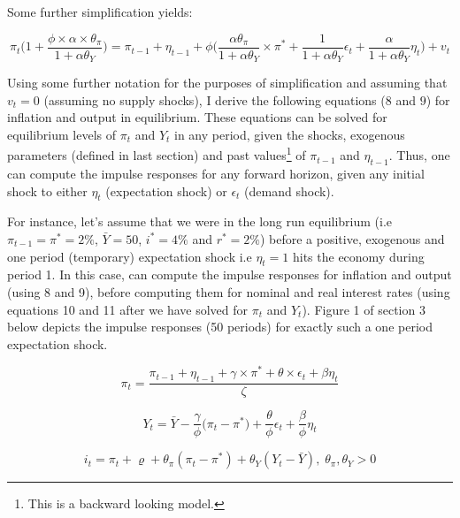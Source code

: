 \documentclass[12pt]{article}
\newcommand{\1}{\mathbbm 1}
\renewcommand{\rho}{\varrho}
\begin{document}
Some further simplification yields:

\begin{equation*}
	\pi_{t}\bigg(1 +  \frac{\phi \times \alpha \times \theta_{\pi}}{1 + \alpha \theta_{Y}}\bigg)  = \pi_{t-1} + \eta_{t-1} + \phi\bigg(\frac{\alpha \theta_{\pi}}{1 + \alpha \theta_{Y}} \times \pi^{*} + \frac{1}{1 + \alpha \theta_{Y}} \epsilon_{t} + \frac{\alpha}{1 + \alpha \theta_{Y}} \eta_{t} \bigg) + v_{t}
\end{equation*}

Using some further notation for the purposes of simplification and assuming that $v_{t} = 0$ (assuming no supply shocks), I derive the following equations ($8$ and $9$) for inflation and output in equilibrium. These equations can be solved for equilibrium levels of $\pi_{t}$ and $Y_{t}$ in any period, given the shocks, exogenous parameters (defined in last section) and past values\footnote{This is a backward looking model.} of $\pi_{t-1}$ and $\eta_{t-1}$. Thus, one can compute the impulse responses for any forward horizon, given any initial shock to either $\eta_{t}$ (expectation shock) or $\epsilon_{t}$ (demand shock). 

For instance, let's assume that we were in the long run equilibrium (i.e $\pi_{t-1} = \pi^{*} = 2\%$, $\bar{Y} = 50$, $i^{*} = 4\%$ and $r^{*} = 2\%$) before a positive, exogenous and one period (temporary) expectation shock i.e $\eta_{t} = 1$ hits the economy during period 1. In this case, can compute the impulse responses for inflation and output (using 8 and 9), before computing them for nominal and real interest rates (using equations 10 and 11 after we have solved for $\pi_{t}$ and $Y_{t}$). Figure 1 of section 3 below depicts the impulse responses (50 periods) for exactly such a one period expectation shock.

\begin{equation}
	\pi_{t}  = \frac{\pi_{t-1} + \eta_{t-1} + \gamma \times \pi^{*} + \theta \times \epsilon_{t} +  \beta \eta_{t}}{\zeta}
\end{equation}

\begin{equation}
	Y_{t}  = \bar{Y} - \frac{\gamma}{\phi} \bigg(\pi_{t} - \pi^{*}\bigg) + \frac{\theta}{\phi} \epsilon_{t} + \frac{\beta}{\phi} \eta_{t}
\end{equation}


	

\begin{equation}
	i_{t} = \pi_{t} + \rho + \theta_{\pi} (\pi_{t} - \pi^{*}) + \theta_{Y} (Y_{t} - \bar{Y}), \; \theta_{\pi}, \theta_{Y} > 0
\end{equation}
\end{document}
